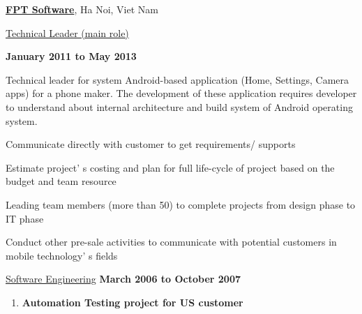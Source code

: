 \documentclass[10pt]{article}
\renewcommand\textit[1]{\underline{#1}}
\begin{document}
\href{http://fpt-software.com}{\textbf{FPT Software}},
Ha Noi, Viet Nam
\begin{outerlist}

    \item[] \textit{Technical Leader (main role)}%

            \hfill \textbf{January 2011 to May 2013}
            \begin{innerlist}
                \item Technical leader for system Android-based application (Home, Settings, Camera apps) for a phone maker. The development of these application requires developer to understand about internal architecture and build system of Android operating system.              

                \item Communicate  directly  with  customer  to  get  requirements/ supports

                \item Estimate  project' s  costing  and  plan  for  full  life-cycle  of  project  based  on  the  budget  and team  resource

	     \item  Leading  team members  (more than 50) to  complete  projects  from  design  phase  to  IT  phase 

	     \item Conduct  other  pre-sale  activities  to  communicate  with  potential  customers  in mobile technology' s  fields

            \end{innerlist}

    \item[] \textit{Software Engineering}%
            \hfill \textbf{March 2006 to October 2007}

            \begin{enumerate}
                \item \textbf{Automation Testing project for US customer}

\end{enumerate}
\end{outerlist}
\end{document}
